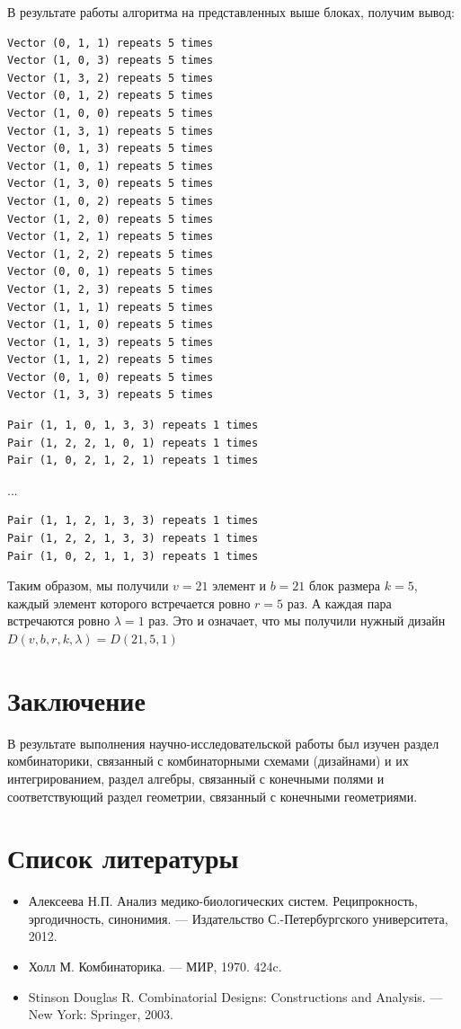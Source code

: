 \documentclass[12pt]{article}
\begin{document}
В результате работы алгоритма на представленных выше блоках, получим вывод:
\small
\begin{lstlisting}
Vector (0, 1, 1) repeats 5 times
Vector (1, 0, 3) repeats 5 times
Vector (1, 3, 2) repeats 5 times
Vector (0, 1, 2) repeats 5 times
Vector (1, 0, 0) repeats 5 times
Vector (1, 3, 1) repeats 5 times
Vector (0, 1, 3) repeats 5 times
Vector (1, 0, 1) repeats 5 times
Vector (1, 3, 0) repeats 5 times
Vector (1, 0, 2) repeats 5 times
Vector (1, 2, 0) repeats 5 times
Vector (1, 2, 1) repeats 5 times
Vector (1, 2, 2) repeats 5 times
Vector (0, 0, 1) repeats 5 times
Vector (1, 2, 3) repeats 5 times
Vector (1, 1, 1) repeats 5 times
Vector (1, 1, 0) repeats 5 times
Vector (1, 1, 3) repeats 5 times
Vector (1, 1, 2) repeats 5 times
Vector (0, 1, 0) repeats 5 times
Vector (1, 3, 3) repeats 5 times
\end{lstlisting}
\begin{lstlisting}
Pair (1, 1, 0, 1, 3, 3) repeats 1 times
Pair (1, 2, 2, 1, 0, 1) repeats 1 times
Pair (1, 0, 2, 1, 2, 1) repeats 1 times
\end{lstlisting}
...
\begin{lstlisting}[firstnumber=166]
Pair (1, 1, 2, 1, 3, 3) repeats 1 times
Pair (1, 2, 2, 1, 3, 3) repeats 1 times
Pair (1, 0, 2, 1, 1, 3) repeats 1 times
\end{lstlisting} \leavevmode 
\normalsize
Таким образом, мы получили $v=21$ элемент и $b=21$ блок размера $k=5$, каждый элемент которого встречается ровно $r=5$ раз. А каждая пара встречаются ровно $\lambda=1$ раз. Это и означает, что мы получили нужный дизайн $D(v,b,r,k,\lambda) = D(21,5,1)$
\section{Заключение}
В результате выполнения научно-исследовательской работы был изучен раздел комбинаторики, связанный с комбинаторными схемами (дизайнами) и их интегрированием, раздел алгебры, связанный с конечными полями и соответствующий раздел геометрии, связанный с конечными геометриями. 
\section{Список литературы}
\begin{itemize}
    \item Алексеева Н.П. Анализ медико-биологических систем. Реципрокность, эргодичность, синонимия. — Издательство С.-Петербургского университета, 2012.
    \item Холл М. Комбинаторика. — МИР, 1970. 424c.
    \item Stinson Douglas R. Combinatorial Designs: Constructions and Analysis. — New York: Springer, 2003.
\end{itemize}
\end{document}
